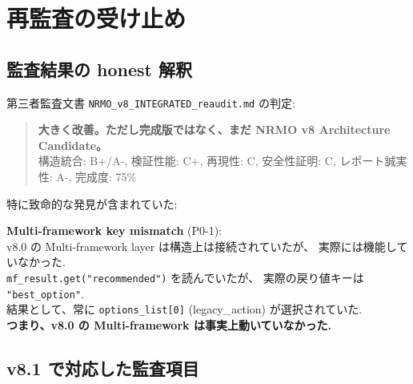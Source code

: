 \documentclass[a4paper,11pt]{report}
\begin{document}
\tableofcontents
\newpage

\chapter{再監査の受け止め}

\section{監査結果の honest 解釈}

第三者監査文書 \texttt{NRMO\_v8\_INTEGRATED\_reaudit.md} の判定:

\begin{quote}
\textbf{大きく改善。ただし完成版ではなく、まだ NRMO v8 Architecture Candidate。}\\
構造統合: B+/A-, 検証性能: C+, 再現性: C, 安全性証明: C, 
レポート誠実性: A-, 完成度: 75\%
\end{quote}

特に致命的な発見が含まれていた:

\begin{critical}
\textbf{Multi-framework key mismatch} (P0-1):\\
v8.0 の Multi-framework layer は構造上は接続されていたが、
実際には機能していなかった.\\
\texttt{mf\_result.get("recommended")} を読んでいたが、
実際の戻り値キーは \texttt{"best\_option"}.\\
結果として、常に \texttt{options\_list[0]} (legacy\_action) が選択されていた.\\
\textbf{つまり、v8.0 の Multi-framework は事実上動いていなかった.}
\end{critical}

\section{v8.1 で対応した監査項目}
\end{document}
